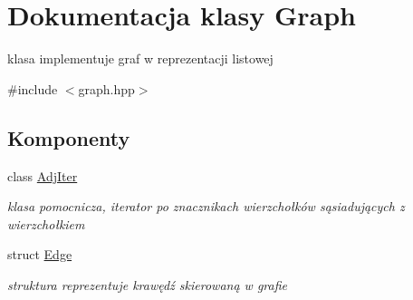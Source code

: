 \hypertarget{classGraph}{\section{Dokumentacja klasy Graph}
\label{classGraph}
}


klasa implementuje graf w reprezentacji listowej  




{\ttfamily \#include $<$graph.\-hpp$>$}

\subsection*{Komponenty}
\begin{DoxyCompactItemize}
\item 
class \hyperlink{classGraph_1_1AdjIter}{Adj\-Iter}
\begin{DoxyCompactList}\small\item\em klasa pomocnicza, iterator po znacznikach wierzchołków sąsiadujących z wierzchołkiem \end{DoxyCompactList}\item 
struct \hyperlink{structGraph_1_1Edge}{Edge}
\begin{DoxyCompactList}\small\item\em struktura reprezentuje krawędź skierowaną w grafie \end{DoxyCompactList}\end{DoxyCompactItemize}
